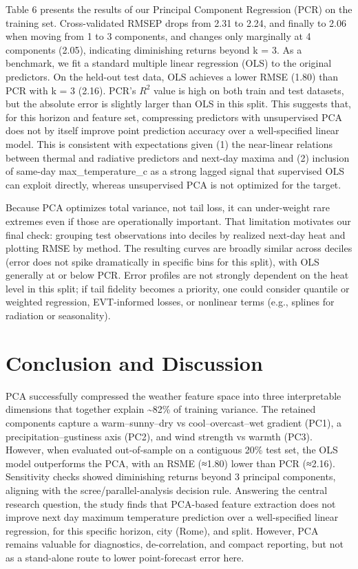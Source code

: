 \documentclass[
]{article}
\begin{document}
Table 6 presents the results of our Principal Component Regression (PCR)
on the training set. Cross-validated RMSEP drops from 2.31 to 2.24, and
finally to 2.06 when moving from 1 to 3 components, and changes only
marginally at 4 components (2.05), indicating diminishing returns beyond
k = 3. As a benchmark, we fit a standard multiple linear regression
(OLS) to the original predictors. On the held-out test data, OLS
achieves a lower RMSE (1.80) than PCR with k = 3 (2.16). PCR's \(R^2\)
value is high on both train and test datasets, but the absolute error is
slightly larger than OLS in this split. This suggests that, for this
horizon and feature set, compressing predictors with unsupervised PCA
does not by itself improve point prediction accuracy over a
well-specified linear model. This is consistent with expectations given
(1) the near-linear relations between thermal and radiative predictors
and next-day maxima and (2) inclusion of same-day max\_temperature\_c as
a strong lagged signal that supervised OLS can exploit directly, whereas
unsupervised PCA is not optimized for the target.

Because PCA optimizes total variance, not tail loss, it can under-weight
rare extremes even if those are operationally important. That limitation
motivates our final check: grouping test observations into deciles by
realized next-day heat and plotting RMSE by method. The resulting curves
are broadly similar across deciles (error does not spike dramatically in
specific bins for this split), with OLS generally at or below PCR. Error
profiles are not strongly dependent on the heat level in this split; if
tail fidelity becomes a priority, one could consider quantile or
weighted regression, EVT-informed losses, or nonlinear terms (e.g.,
splines for radiation or seasonality).

\section{Conclusion and Discussion}\label{conclusion-and-discussion}

PCA successfully compressed the weather feature space into three
interpretable dimensions that together explain \textasciitilde82\% of
training variance. The retained components capture a warm--sunny--dry vs
cool--overcast--wet gradient (PC1), a precipitation--gustiness axis
(PC2), and wind strength vs warmth (PC3). However, when evaluated
out-of-sample on a contiguous 20\% test set, the OLS model outperforms
the PCA, with an RSME (≈1.80) lower than PCR (≈2.16). Sensitivity checks
showed diminishing returns beyond 3 principal components, aligning with
the scree/parallel-analysis decision rule. Answering the central
research question, the study finds that PCA-based feature extraction
does not improve next day maximum temperature prediction over a
well-specified linear regression, for this specific horizon, city
(Rome), and split. However, PCA remains valuable for diagnostics,
de-correlation, and compact reporting, but not as a stand-alone route to
lower point-forecast error here.
\end{document}
